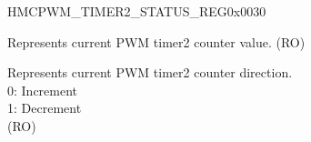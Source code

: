\begin{register}{H}{MCPWM\_TIMER2\_STATUS\_REG}{0x0030}\label{regdesc:MCPWMTIMER2STATUSREG}
%
%
%
\regnewline%
\begin{regdesc}\begin{reglist}
\label{fielddesc:MCPWMTIMER2VALUE}\item [MCPWM\_TIMER2\_VALUE] Represents current PWM timer2 counter value. (RO)
\label{fielddesc:MCPWMTIMER2DIRECTION}\item [MCPWM\_TIMER2\_DIRECTION] Represents current PWM timer2 counter direction.
\\0: Increment
\\1: Decrement
\\(RO)
\end{reglist}\end{regdesc}
\end{register}


